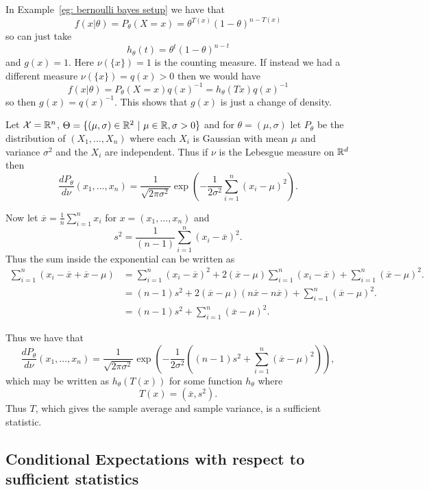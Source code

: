 \documentclass[twoside, a4paper, 10pt]{amsart}
\begin{document}
\begin{eg} In Example~\ref{eg: bernoulli bayes setup} we have that $$f(x|\theta) = P_{\theta}(X = x) =   \theta^{T(x)}(1-\theta)^{n - T(x)} $$ so can just take $$h_{\theta}(t) = \theta^t(1-\theta)^{n-t}$$ and $g(x)=1$. Here $\nu(\{x\})=1$ is the counting measure. If instead we had a different measure $\nu(\{x\})=q(x)>0$ then we would have $$f(x|\theta) =  P_{\theta}(X = x) q(x)^{-1} = h_{\theta}(Tx) q(x)^{-1} $$ so then $g(x) = q(x)^{-1}$. This shows that $g(x)$ is just a change of density.

\end{eg}

\begin{eg}\label{eg: normal sufficient} Let $\mathcal{X} = \mathbb{R}^n$, $\Theta = \{ (\mu, \sigma) \in \mathbb{R}^2 ~|~ \mu \in \mathbb{R}, \sigma>0\}$ and for $\theta = (\mu, \sigma)$ let $P_{\theta}$ be the distribution of $(X_1, \ldots, X_n)$ where each $X_i$ is Gaussian with mean $\mu$ and variance $\sigma^2$ and the $X_i$ are independent. Thus if $\nu$ is the Lebesgue measure on $\mathbb{R}^d$ then $$\frac{dP_{\theta}}{d\nu}(x_1, \ldots, x_n) = \frac{1}{\sqrt{2\pi\sigma^2}} \exp\left(-\frac{1}{2\sigma^2}\sum_{i=1}^n(x_i - \mu)^2 \right). $$

Now let $\overline{x} = \frac{1}{n}\sum_{i=1}^n x_i$ for $x=(x_1, \ldots, x_n)$ and $$s^2 = \frac{1}{(n-1)} \sum_{i=1}^n(x_i - \overline{x})^2.$$ Thus the sum inside the exponential can be written as 
\begin{align*}\sum_{i=1}^n(x_i - \overline{x} + \overline{x} - \mu) &= \sum_{i=1}^n(x_i - \overline{x})^2 + 2 (\overline{x} - \mu)\sum_{i=1}^n(x_i - \overline{x}) + \sum_{i=1}^n (\overline{x}-\mu)^2. \\ 
&=  (n-1)s^2 + 2 (\overline{x} - \mu)(n\overline{x}- n\overline{x}) + \sum_{i=1}^n (\overline{x}-\mu)^2. \\
&= (n-1)s^2 + \sum_{i=1}^n (\overline{x}-\mu)^2.\end{align*}

Thus we have that 
$$\frac{dP_{\theta}}{d\nu}(x_1, \ldots, x_n)  = \frac{1}{\sqrt{2\pi\sigma^2}} \exp\left(-\frac{1}{2\sigma^2}\left( (n-1)s^2 + \sum_{i=1}^n (\overline{x}-\mu)^2 \right) \right), $$ which may be written as $h_{\theta}(T(x))$ for some function $h_{\theta}$ where $$T(x) = (\overline{x}, s^2).$$ Thus $T$, which gives the sample average and sample variance, is a sufficient statistic.

\end{eg}

\subsection{Conditional Expectations with respect to sufficient statistics}
\end{document}
